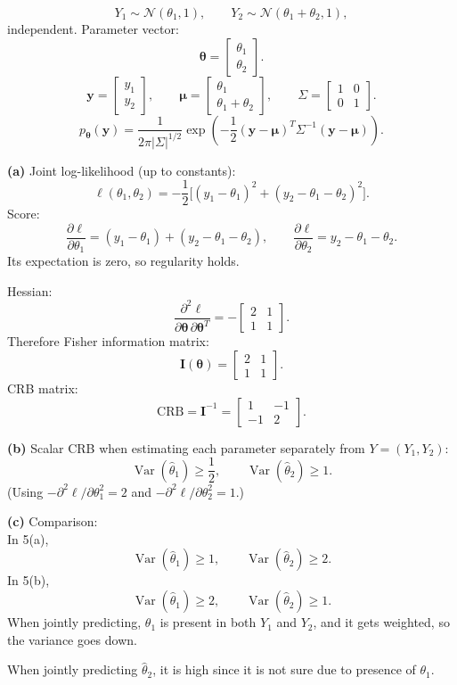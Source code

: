 \documentclass[12pt,a4paper,onecolumn]{exam}
\begin{document}
\begin{solution}
\[
Y_1\sim\mathcal N(\theta_1,1),\qquad
Y_2\sim\mathcal N(\theta_1+\theta_2,1),
\]
independent. Parameter vector:
\[
\boldsymbol\theta=
\begin{bmatrix}
\theta_1\\
\theta_2
\end{bmatrix}.
\]
\[
\mathbf y=
\begin{bmatrix}
y_1\\
y_2
\end{bmatrix},\qquad
\boldsymbol\mu=
\begin{bmatrix}
\theta_1\\
\theta_1+\theta_2
\end{bmatrix},\qquad
\Sigma=
\begin{bmatrix}
1&0\\
0&1
\end{bmatrix}.
\]
\[
p_{\boldsymbol\theta}(\mathbf y)
=\frac{1}{2\pi|\Sigma|^{1/2}}
\exp\!\left(-\frac12(\mathbf y-\boldsymbol\mu)^T\Sigma^{-1}(\mathbf y-\boldsymbol\mu)\right).
\]

\textbf{(a)} Joint log-likelihood (up to constants):
\[
\ell(\theta_1,\theta_2)
 =-\frac12\Big[(y_1-\theta_1)^2+(y_2-\theta_1-\theta_2)^2\Big].
\]
Score:
\[
\frac{\partial\ell}{\partial\theta_1}=(y_1-\theta_1)+(y_2-\theta_1-\theta_2),\qquad
\frac{\partial\ell}{\partial\theta_2}=y_2-\theta_1-\theta_2.
\]
Its expectation is zero, so regularity holds.

Hessian:
\[
\frac{\partial^2\ell}{\partial\boldsymbol\theta\,\partial\boldsymbol\theta^T}
=-
\begin{bmatrix}
2&1\\
1&1
\end{bmatrix}.
\]
Therefore Fisher information matrix:
\[
\mathbf I(\boldsymbol\theta)=
\begin{bmatrix}
2&1\\
1&1
\end{bmatrix}.
\]
CRB matrix:
\[
\mathrm{CRB}=\mathbf I^{-1}=
\begin{bmatrix}
1&-1\\
-1&2
\end{bmatrix}.
\]

\textbf{(b)} Scalar CRB when estimating each parameter separately from $Y=(Y_1,Y_2)$:
\[
\operatorname{Var}(\hat\theta_1)\ge \frac{1}{2},\qquad
\operatorname{Var}(\hat\theta_2)\ge 1.
\]
(Using $-\partial^2\ell/\partial\theta_1^2=2$ and $-\partial^2\ell/\partial\theta_2^2=1$.)

\textbf{(c)} Comparison: \\
In 5(a),
\[
\operatorname{Var}(\hat\theta_1)\ge 1,\qquad
\operatorname{Var}(\hat\theta_2)\ge 2.
\]
In 5(b),
\[
\operatorname{Var}(\hat\theta_1)\ge 2,\qquad
\operatorname{Var}(\hat\theta_2)\ge 1.
\]
When jointly predicting, $\theta_1$ is present in both $Y_1$ and $Y_2$, and it gets weighted, so the variance goes down.

When jointly predicting $\hat\theta_2$, it is high since it is not sure due to presence of $\theta_1$.

\end{solution}
\end{document}
